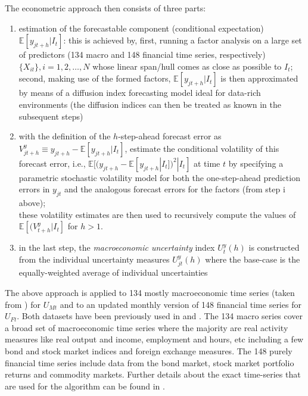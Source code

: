 \documentclass[a4paper,11pt,listof=nochaptergap,oneside,pointednumbers,bibtotoc,bigheadings,liststotoc,hidelinks]{scrbook}
\theoremstyle{mysatz}
\theoremstyle{mydefinition}
\theoremstyle{mytheorem}
\theoremstyle{mybemerkung}
\begin{document}
The econometric approach then consists of three parts:
\begin{enumerate}[i]
	\item estimation of the forecastable component (conditional expectation) $\mathbb{E}[y_{jt+h}|I_t]$: this is achieved by, first, running a factor analysis on a large set of predictors (134 macro and 148 financial time series, respectively) $\{X_{it}\}, i = 1, 2, \dots, N$ whose linear span/hull comes as close as possible to $I_t$; second, making use of the formed factors, $\mathbb{E}[y_{jt+h}|I_t]$ is then approximated by means of a diffusion index forecasting model ideal for data-rich environments (the diffusion indices can then be treated as known in the subsequent steps)
	\item with the definition of the $h$-step-ahead forecast error as $V_{jt+h}^y \equiv y_{jt+h} - \mathbb{E}[y_{jt+h}|I_t]$, \citet{juradoetal:15} estimate the conditional volatility of this forecast error, i.e., $\mathbb{E}[(y_{jt+h} - \mathbb{E}[y_{jt+h}|I_t])^2|I_t]$ at time $t$ by specifying a parametric stochastic volatility model for both the one-step-ahead prediction errors in $y_{jt}$ and the analogous forecast errors for the factors (from step i above); \\
	these volatility estimates are then used to recursively compute the values of $\mathbb{E}[(V_{t+h}^y|I_t]$ for $h > 1$. 
	\item in the last step, the \textit{macroeconomic uncertainty} index $U_t^y(h)$ is constructed from the individual uncertainty measures $U_{jt}^y(h)$ where the base-case is the equally-weighted average of individual uncertainties
\end{enumerate}

The above approach is applied to 134 mostly macroeconomic time series (taken from \citealp{mccrackenandng:16}) for $U_{Mt}$ and to an updated monthly version of 148 financial time series for $U_{Ft}$. Both datasets have been previously used in \citet{ludvigsonandng:07} and \citet{juradoetal:15}. The 134 macro series cover a broad set of macroeconomic time series where the majority are real activity measures like real output and income, employment and hours, etc including a few bond and stock market indices and foreign exchange measures. The 148 purely financial time series  include data from the bond market, stock market portfolio returns and commodity markets. Further details about the exact time-series that are used for the algorithm can be found in \citet{ludvigsonetal:19}.
\end{document}
